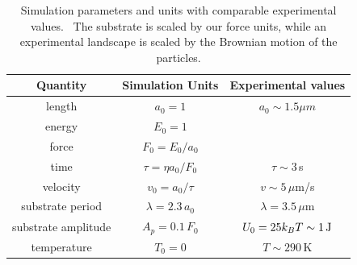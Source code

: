 \documentclass[preprint,showpacs,preprintnumbers,amsmath,amssymb,aps,prb]{revtex4-1}
\theoremstyle{remark}
\begin{document}
\begin{table}[h!]
\centering
\caption{Simulation parameters and units with comparable
  experimental values.~\cite{Juniper2015,Juniper2017} The substrate is scaled by our force units, while an experimental landscape is scaled by the Brownian motion of the particles.  }
\begin{ruledtabular}
\begin{tabular}{c c c } 
Quantity & Simulation Units & Experimental values\\
\hline
length &  $a_0 = 1$ & $ a_0 \sim 1.5 \mu m$\\
energy & $E_0 = 1$ & \\ %
force & $F_0 = E_0 / a_0$ & \\ %
time &  $ \tau = \eta a_0 / F_0 $ & $ \tau \sim 3$\,s\\
velocity &  $ v_0 = a_0 / \tau $ &  $v \sim 5\,\mu$m/s \\
substrate period & $\lambda = 2.3\,a_0$ & $\lambda = 3.5\,\mu$m \\
substrate amplitude & $A_p = 0.1\,F_0$ & $U_0 = 25 k_B T \sim 1\, {\rm J}$ \\ %
temperature & $T_0 = 0$  & $T \sim 290\,$K  \\
\end{tabular}
\end{ruledtabular}
\label{tab:1}
\end{table}
\end{document}
